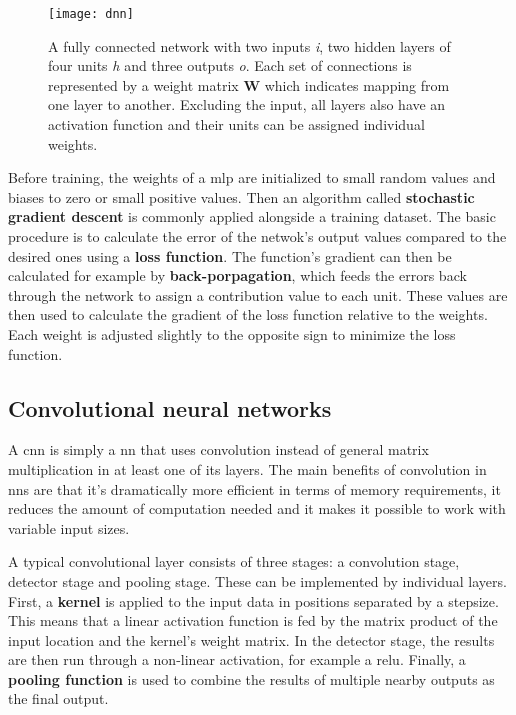 \begin{figure}[H]
\centering
\texttt{[image: dnn]}
\caption{A fully connected network with two inputs \textit{i}, two hidden layers of
         four units \textit{h} and three outputs \textit{o}. Each set of connections
         is represented by a weight matrix \textbf{W} which indicates mapping from one
         layer to another. Excluding the input, all layers also have an activation
         function and their units can be assigned individual weights.}\label{fig:fcon}
\end{figure}

Before training, the weights of a \ac{mlp} are initialized to small random values and 
biases to zero or small positive values. Then an algorithm called \textbf{stochastic
gradient descent} is commonly applied alongside a training dataset. The basic procedure
is to calculate the error of the netwok's output values compared to the desired ones 
using a \textbf{loss function}. The function's gradient can then be calculated for
example by \textbf{back-porpagation}, which feeds the errors back through the network
to assign a contribution value to each unit. These values are then used to calculate
the gradient of the loss function relative to the weights. Each weight is adjusted
slightly to the opposite sign to minimize the loss function.

\subsection{Convolutional neural networks}\label{ssec:dlcnn}

A \ac{cnn} is simply a \ac{nn} that uses convolution instead of general matrix
multiplication in at least one of its layers. The main benefits of convolution in \ac{nn}s
are that it's dramatically more efficient in terms of memory requirements, it reduces
the amount of computation needed and it makes it possible to work with variable input
sizes.

A typical convolutional layer consists of three stages: a convolution stage, detector
stage and pooling stage. These can be implemented by individual layers. First, a
\textbf{kernel} is applied to the input data in positions separated by a stepsize. This
means that a linear activation function is fed by the matrix product of the input location
and the kernel's weight matrix. In the detector stage, the results are then run through
a non-linear activation, for example a \ac{relu}. Finally, a \textbf{pooling function}
is used to combine the results of multiple nearby outputs as the final output.

